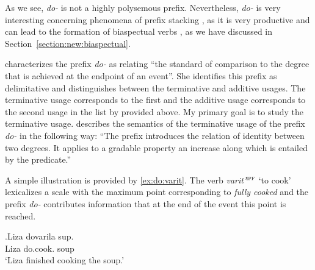As we see, \textit{do-}   is not a highly polysemous prefix. Nevertheless, \textit{do-}   is very interesting concerning phenomena of prefix stacking , as it is very productive and can lead to the formation of biaspectual verbs , as we have discussed in Section~\ref{section:new:biaspectual}. 

\citet[70]{Kagan:book} characterizes the prefix \textit{do-}   as relating ``the standard of comparison  to the degree that is achieved at the endpoint of an event''. She identifies this prefix as delimitative  and distinguishes between the terminative  and additive  usages. The terminative  usage corresponds to the first and the additive usage corresponds to the second usage in the list by \citet{Shvedova:82} provided above. My primary goal is to study the terminative  usage. \citet[72]{Kagan:book} describes the semantics of the terminative  usage of the prefix \textit{do-}   in the following way: ``The prefix introduces the relation of identity between two degrees. It applies to a gradable property an increase along which is entailed by the predicate.''

A simple illustration is provided by \ref{ex:do:varit}. The verb \textit{varit'}$^{\textsc{ipf}}$ `to cook' lexicalizes a scale with the maximum point corresponding to \textit{fully cooked} and the prefix \textit{do-}   contributes information that at the end of the event this point is reached. 

\exg.\label{ex:do:varit}Liza dovarila sup.\\
Liza do.cook. soup\\
\trans `Liza finished cooking the soup.'

